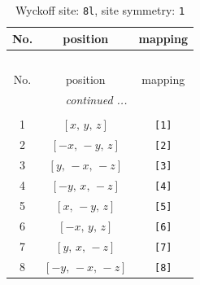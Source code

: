 \documentclass[fleqn,8pt]{jsarticle}
\begin{document}
\renewcommand{\arraystretch}{1.2}
\begin{longtable}{ccc}
\caption{Wyckoff site: {\tt 8l}, site symmetry: {\tt 1}}
 \\
 \hline \hline
No. & position & mapping \\ \hline \endfirsthead

\multicolumn{2}{l}{\tablename\ \thetable{}} \\
 \hline \hline
No. & position & mapping \\ \hline \endhead

 \hline \hline
\multicolumn{2}{r}{\footnotesize\it continued ...} \\ \endfoot

 \hline \hline
\multicolumn{2}{r}{} \\ \endlastfoot

1 & $\left[ x,\, y,\, z \right]$ & {\tt [1]} \\ \hline
2 & $\left[ - x,\, - y,\, z \right]$ & {\tt [2]} \\ \hline
3 & $\left[ y,\, - x,\, - z \right]$ & {\tt [3]} \\ \hline
4 & $\left[ - y,\, x,\, - z \right]$ & {\tt [4]} \\ \hline
5 & $\left[ x,\, - y,\, z \right]$ & {\tt [5]} \\ \hline
6 & $\left[ - x,\, y,\, z \right]$ & {\tt [6]} \\ \hline
7 & $\left[ y,\, x,\, - z \right]$ & {\tt [7]} \\ \hline
8 & $\left[ - y,\, - x,\, - z \right]$ & {\tt [8]} \\
\end{longtable}
\end{document}
